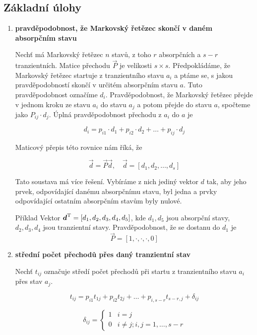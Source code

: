 \subsection{Základní úlohy}
\begin{enumerate}[label=\arabic*)]
\item \textbf{pravděpodobnost, že Markovský řetězec skončí v daném absorpčním stavu}\br

	Nechť má Markovský řetězec $n$ stavů, z toho $r$ absorpčních a $s-r$ tranzientních. Matice přechodu $\vec{P}$ je velikosti $s\times s$. Předpokládáme, že Markovský řetězec startuje z tranzientního stavu $a_i$ a ptáme se, s jakou pravděpodobností skončí v určitém absorpčním stavu $a$. Tuto pravděpodobnost označíme $d_i$. Pravděpodobnost, že Markovský řetězec přejde v jednom kroku ze stavu $a_i$ do stavu $a_j$ a potom přejde do stavu $a$, spočteme jako $P_{ij}\cdot d_j$. Úplná pravděpodobnost přechodu z $a_i$ do $a$ je
	
	\[ d_i=p_{i1}\cdot d_1+ p_{i2}\cdot d_2 + \ldots + p_{ij}\cdot d_j \]
	
	Maticový přepis této rovnice nám říká, že 
	
	\[ \vec{d} = \vec{P}\vec{d},\quad \vec{d}=[d_1,d_2,\ldots,d_s] \]
	
	Tato soustava má více řešení. Vybíráme z nich jediný vektor $d$ tak, aby jeho prvek, odpovídající danému absorpčnímu stavu,  byl jedna a prvky odpovídající ostatním absorpčním stavům byly nulové.
	
	\begin{note}{Příklad}
		Vektor $\boldsymbol{d}^{\mathrm{T}}=[d_1,d_2,d_3,d_4,d_5]$, kde $d_1,d_5$ jsou absorpční stavy, $d_2,d_3,d_4$ jsou tranzientní stavy. Pravděpodobnost, že se dostanu do $d_1$ je
		\[ \vec{P} = [1,\cdot,\cdot,\cdot,0] \]		
		
	\end{note}

\item \textbf{střední počet přechodů přes daný tranzientní stav}\br

	Nechť $t_{ij}$ označuje středí počet přechodů při startu z tranzientního stavu $a_i$ přes stav $a_j$.
	
	\[ t_{ij}=p_{i1}t_{1j}+p_{i2}t_{2j}+\ldots+p_{i,s-r}t_{s-r,j}+\delta_{ij} \]
	
	\[ \delta_{ij}=
	\begin{cases}
	1 & i=j\\
	0 & i\neq j; i,j = 1,\ldots, s-r
	\end{cases}
	\]
	

\end{enumerate}
